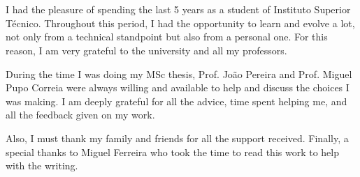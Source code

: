 
\section*{\acknowledgments}

I had the pleasure of spending the last 5 years as a student of Instituto Superior Técnico. Throughout this period, I had the opportunity to learn and evolve a lot, not only from a technical standpoint but also from a personal one. For this reason, I am very grateful to the university and all my professors.

During the time I was doing my MSc thesis, Prof. João Pereira and Prof. Miguel Pupo Correia were always willing and available to help and discuss the choices I was making. I am deeply grateful for all the advice, time spent helping me, and all the feedback given on my work. 

Also, I must thank my family and friends for all the support received. Finally, a special thanks to Miguel Ferreira who took the time to read this work to help with the writing.


